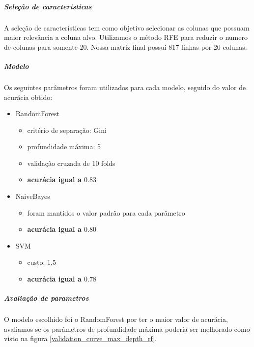 \subparagraph{Seleção de características}

A seleção de características tem como objetivo selecionar as colunas que possuam maior relevância a coluna alvo. Utilizamos o método RFE para reduzir o numero de colunas para somente 20. Nossa matriz final possui 817 linhas por 20 colunas.

\subparagraph{Modelo}

Os seguintes parâmetros foram utilizados para cada modelo, seguido do valor de acurácia obtido:
	
\begin{itemize}
  \item RandomForest
  \begin{itemize}
    \item critério de separação: Gini
    \item profundidade máxima: 5
    \item validação cruzada de 10 folds
    \item \textbf{acurácia igual a $0.83$}
  \end{itemize}
  \item NaiveBayes
  \begin{itemize}
    \item foram mantidos o valor padrão para cada parâmetro
    \item \textbf{acurácia igual a $0.80$}
  \end{itemize}
  \item SVM
  \begin{itemize}
    \item custo: 1,5
    \item \textbf{acurácia igual a $0.78$}
  \end{itemize}
\end{itemize}	

\subparagraph{Avaliação de parametros}
	
O modelo escolhido foi o RandomForest por ter o maior valor de acurácia, avaliamos se os parâmetros de profundidade máxima poderia ser melhorado como visto na figura \ref{validation_curve_max_depth_rf}.

